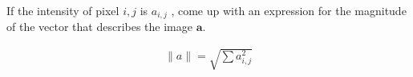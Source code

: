 If the intensity of pixel $i,j$ is $a_{i,j}$ , come up with an expression for the magnitude of the vector that describes the image $\boldsymbol{a}$.

\begin{solution}
    \begin{align*}
        \|a\| = \sqrt{\sum a_{i,j}^2}
    \end{align*}
\end{solution}